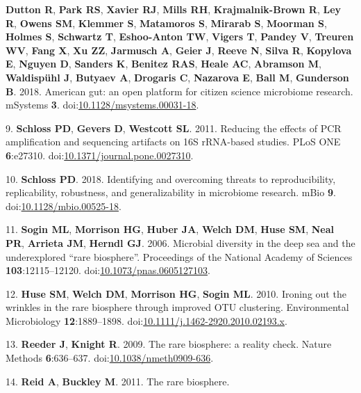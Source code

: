 \documentclass[]{article}
\begin{document}
\textbf{Dutton R}, \textbf{Park RS}, \textbf{Xavier RJ}, \textbf{Mills
RH}, \textbf{Krajmalnik-Brown R}, \textbf{Ley R}, \textbf{Owens SM},
\textbf{Klemmer S}, \textbf{Matamoros S}, \textbf{Mirarab S},
\textbf{Moorman S}, \textbf{Holmes S}, \textbf{Schwartz T},
\textbf{Eshoo-Anton TW}, \textbf{Vigers T}, \textbf{Pandey V},
\textbf{Treuren WV}, \textbf{Fang X}, \textbf{Xu ZZ}, \textbf{Jarmusch
A}, \textbf{Geier J}, \textbf{Reeve N}, \textbf{Silva R},
\textbf{Kopylova E}, \textbf{Nguyen D}, \textbf{Sanders K},
\textbf{Benitez RAS}, \textbf{Heale AC}, \textbf{Abramson M},
\textbf{Waldispühl J}, \textbf{Butyaev A}, \textbf{Drogaris C},
\textbf{Nazarova E}, \textbf{Ball M}, \textbf{Gunderson B}. 2018.
American gut: an open platform for citizen science microbiome research.
mSystems \textbf{3}.
doi:\href{http://dx.doi.org/10.1128/msystems.00031-18}{10.1128/msystems.00031-18}.

9. \textbf{Schloss PD}, \textbf{Gevers D}, \textbf{Westcott SL}. 2011.
Reducing the effects of PCR amplification and sequencing artifacts on
16S rRNA-based studies. PLoS ONE \textbf{6}:e27310.
doi:\href{http://dx.doi.org/10.1371/journal.pone.0027310}{10.1371/journal.pone.0027310}.

10. \textbf{Schloss PD}. 2018. Identifying and overcoming threats to
reproducibility, replicability, robustness, and generalizability in
microbiome research. mBio \textbf{9}.
doi:\href{http://dx.doi.org/10.1128/mbio.00525-18}{10.1128/mbio.00525-18}.

11. \textbf{Sogin ML}, \textbf{Morrison HG}, \textbf{Huber JA},
\textbf{Welch DM}, \textbf{Huse SM}, \textbf{Neal PR}, \textbf{Arrieta
JM}, \textbf{Herndl GJ}. 2006. Microbial diversity in the deep sea and
the underexplored ``rare biosphere''. Proceedings of the National
Academy of Sciences \textbf{103}:12115--12120.
doi:\href{http://dx.doi.org/10.1073/pnas.0605127103}{10.1073/pnas.0605127103}.

12. \textbf{Huse SM}, \textbf{Welch DM}, \textbf{Morrison HG},
\textbf{Sogin ML}. 2010. Ironing out the wrinkles in the rare biosphere
through improved OTU clustering. Environmental Microbiology
\textbf{12}:1889--1898.
doi:\href{http://dx.doi.org/10.1111/j.1462-2920.2010.02193.x}{10.1111/j.1462-2920.2010.02193.x}.

13. \textbf{Reeder J}, \textbf{Knight R}. 2009. The rare biosphere: a
reality check. Nature Methods \textbf{6}:636--637.
doi:\href{http://dx.doi.org/10.1038/nmeth0909-636}{10.1038/nmeth0909-636}.

14. \textbf{Reid A}, \textbf{Buckley M}. 2011. The rare biosphere.
\end{document}
